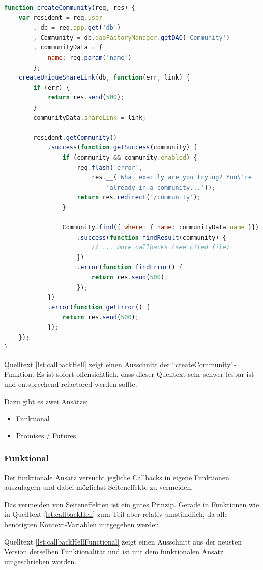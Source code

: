 \begin{lstlisting}[language=JavaScript, firstnumber=136, caption={Ausschnitt aus Community Controller mit Callback Hell \cite{milestone7CommunityController}}, label={lst:callbackHell}]
function createCommunity(req, res) {
	var resident = req.user
		, db = req.app.get('db')
		, Community = db.daoFactoryManager.getDAO('Community')
		, communityData = {
			name: req.param('name')
		};
	createUniqueShareLink(db, function(err, link) {
		if (err) {
			return res.send(500);
		}
		communityData.shareLink = link;

		resident.getCommunity()
			.success(function getSuccess(community) {
				if (community && community.enabled) {
					req.flash('error',
						res.__('What exactly are you trying? You\'re ' +
							'already in a community...'));
					return res.redirect('/community');
				}

				Community.find({ where: { name: communityData.name }})
					.success(function findResult(community) {
						// ... more callbacks (see cited file)
					})
					.error(function findError() {
						return res.send(500);
					});
			})
			.error(function getError() {
				return res.send(500);
			});
	});
}
\end{lstlisting}

Quelltext \ref{lst:callbackHell} zeigt einen Ausschnitt der ``createCommunity''-Funktion. Es ist sofort offensichtlich, dass dieser Quelltext sehr schwer lesbar ist und entsprechend refactored werden sollte.

Dazu gibt es zwei Ansätze:
\begin{itemize}
	\item Funktional
	\item Promises / Futures
\end{itemize}

\subsubsection*{Funktional}
Der funktionale Ansatz versucht jegliche Callbacks in eigene Funktionen auszulagern und dabei möglichst Seiteneffekte zu vermeiden.

Das vermeiden von Seiteneffekten ist ein gutes Prinzip. Gerade in Funktionen wie in Quelltext \ref{lst:callbackHell} zum Teil aber relativ umständlich, da alle benötigten Kontext-Variablen mitgegeben werden.

Quelltext \ref{lst:callbackHellFunctional} zeigt einen Ausschnitt aus der neusten Version derselben Funktionalität und ist mit dem funktionalen Ansatz umgeschrieben worden.

